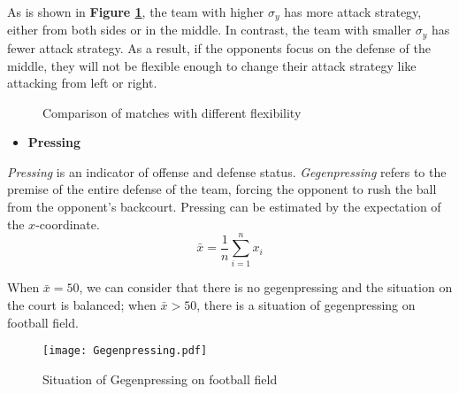 \documentclass[12pt]{article}  %
\begin{document}
As is shown in \textbf{Figure \ref{Fig:Flexibility}}, the team with higher $\sigma_y$ has more attack strategy, either from both sides or in the middle. In contrast, the team with smaller $\sigma_y$ has fewer attack strategy. As a result, if the opponents focus on the defense of the middle, they will not be flexible enough to change their attack strategy like attacking from left or right. 
\begin{figure}[htbp]
    \centering    
    \caption{Comparison of matches with different flexibility}		%
    \label{Fig:Flexibility}									%
\end{figure}



\begin{itemize}
    \item \textbf{Pressing}
\end{itemize}

\textit{Pressing} is an indicator of offense and defense status. \textit{Gegenpressing} refers to the premise of the entire defense of the team, forcing the opponent to rush the ball from the opponent's backcourt. Pressing can be estimated by the expectation of the $x$-coordinate. 
\begin{equation}
    \bar{x}=\frac{1}{n}\sum_{i=1}^{n}x_i
\end{equation}

When $\bar{x} = 50$, we can consider that there is no gegenpressing and the situation on the court is balanced; when $\bar{x}> 50$, there is a situation of gegenpressing on football field.

\begin{figure}[htbp]
    \centering
    \texttt{[image: Gegenpressing.pdf]} 	%
    \caption{Situation of Gegenpressing on football field}		%
    \label{fig:Gegenpressing}							%
\end{figure}
\end{document}
